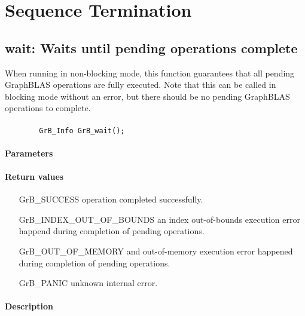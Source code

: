 \section{Sequence Termination}


\subsection{{\sf wait}: Waits until pending operations complete}
\label{Sec:wait}

When running in non-blocking mode, this function guarantees that all pending GraphBLAS operations are fully executed.  Note that this can be called in blocking mode without an error, but there should be no pending GraphBLAS operations to complete.

\paragraph{\syntax}

\begin{verbatim}
        GrB_Info GrB_wait();
\end{verbatim}

\paragraph{Parameters}

\paragraph{Return values}
\begin{itemize}[leftmargin=2.1in]
	\item[{\sf GrB\_SUCCESS}]	operation completed successfully.
	\item[{\sf GrB\_INDEX\_OUT\_OF\_BOUNDS}]	an index out-of-bounds execution error happend during completion of pending operations.
	\item[{\sf GrB\_OUT\_OF\_MEMORY}]		and out-of-memory execution error happened during completion of pending operations.
	\item[{\sf GrB\_PANIC}]		unknown internal error.
\end{itemize}

\paragraph{Description}

